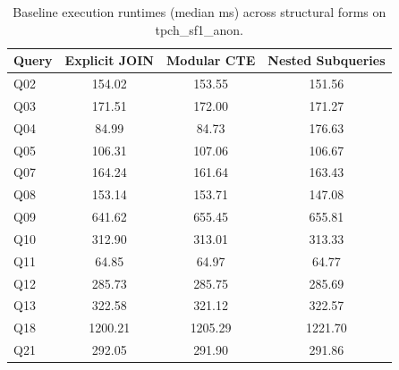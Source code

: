 \begin{table}[h]
\centering
\small
\begin{tabular}{lccc}
\toprule
\textbf{Query} & \textbf{Explicit JOIN} & \textbf{Modular CTE} & \textbf{Nested Subqueries} \\
\midrule
Q02 & 154.02 & 153.55 & 151.56 \\
Q03 & 171.51 & 172.00 & 171.27 \\
Q04 & 84.99 & 84.73 & 176.63 \\
Q05 & 106.31 & 107.06 & 106.67 \\
Q07 & 164.24 & 161.64 & 163.43 \\
Q08 & 153.14 & 153.71 & 147.08 \\
Q09 & 641.62 & 655.45 & 655.81 \\
Q10 & 312.90 & 313.01 & 313.33 \\
Q11 & 64.85 & 64.97 & 64.77 \\
Q12 & 285.73 & 285.75 & 285.69 \\
Q13 & 322.58 & 321.12 & 322.57 \\
Q18 & 1200.21 & 1205.29 & 1221.70 \\
Q21 & 292.05 & 291.90 & 291.86 \\
\bottomrule
\end{tabular}
\caption{Baseline execution runtimes (median ms) across structural forms on tpch_sf1_anon.}
\label{tab:baseline_tpch_sf1_anon}
\end{table}
